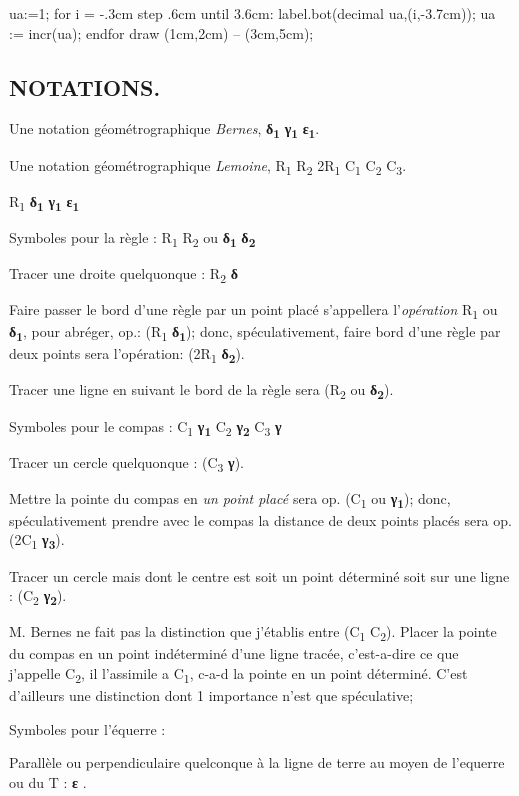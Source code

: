 \documentclass[12pt,a4paper]{book} %
\newcommand{\Ra}[1]{\textcolor{rtLightBlue900}R\textsubscript{\textcolor{rtLightBlue900}{#1}}}
\newcommand{\Rab}[1]{\small{\textcolor{rtLightBlue900}{2}}\textcolor{rtLightBlue900}R\textsubscript{\textcolor{rtLightBlue900}{#1}}}
\newcommand{\gd}[1]{\textbf{δ}\textsubscript{\textbf{#1}}}
\newcommand{\gc}[1]{\textbf{γ}\textsubscript{\textbf{#1}}}
\newcommand{\gq}[1]{\textbf{ε}\textsubscript{\textbf{#1}}}
\newcommand{\Ca}[1]{\textcolor{rtLightBlue900}C\textsubscript{\textcolor{rtLightBlue900}{#1}}}
\begin{document}
\begin{mpost*}
ua:=1;
for i = -.3cm step .6cm until 3.6cm:
    label.bot(decimal ua,(i,-3.7cm));
    ua := incr(ua);
endfor
  draw (1cm,2cm) -- (3cm,5cm);     
\end{mpost*}


\subsection{NOTATIONS.}

Une notation géométrographique \emph{Bernes},  \gd{1} \gc{1} \gq{1}.

Une notation géométrographique \emph{Lemoine}, \Ra{1} \Ra{2} \Rab{1} \Ca{1} \Ca{2} \Ca{3}.


\Ra{1} \gd{1} \gc{1} \gq{1}

Symboles pour la règle : \Ra{1} \Ra{2} ou \gd{1} \gd{2}

Tracer une droite quelquonque : \Ra{2}  \gd{}

Faire passer le bord d'une règle par un point placé s'appellera l'\emph{opération} \Ra{1} ou \gd{1}, pour abréger, op.: (\Ra{1} \gd{1}); donc, spéculativement, faire bord d'une règle par deux points sera l'opération: (\Rab{1}  \gd{2}).


Tracer une ligne en suivant le bord de la règle sera (\Ra{2} ou \gd{2}).

Symboles pour le compas : \Ca{1} \gc{1} \Ca{2} \gc{2} \Ca{3}  \gc{}

Tracer un cercle quelquonque : (\Ca{3} \gc{}).


Mettre la pointe du compas en \emph{un point placé} sera op. (\Ca{1} ou \gc{1}); donc, spéculativement prendre avec le compas la distance de deux points placés sera op. (2\Ca{1} \gc{3}).

Tracer un cercle mais dont le centre est soit un point déterminé soit sur une ligne  : (\Ca{2} \gc{2}).




M. Bernes ne fait pas la distinction que j'établis entre (\Ca{1} \Ca{2}). Placer la pointe du compas en un point indéterminé d'une ligne tracée, c'est-a-dire ce que j'appelle \Ca{2}, il l'assimile a
\Ca{1}, c-a-d la pointe en un point déterminé. C'est d'ailleurs
une distinction dont 1 importance n'est que spéculative;


Symboles pour l'équerre :

Parallèle ou perpendiculaire quelconque à la ligne de terre au moyen de l'equerre ou du T : \gq{} .
 
\end{document}
